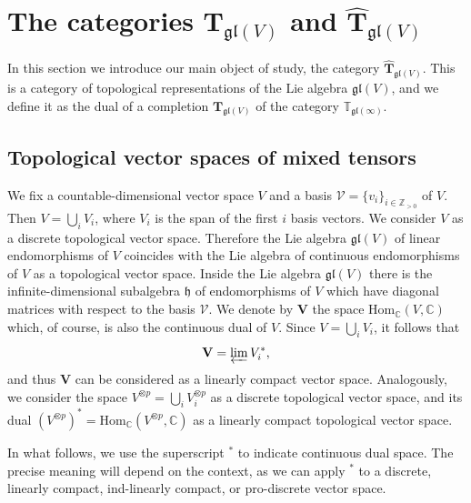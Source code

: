 \documentclass[12pt,reqno]{amsart}
\newcommand{\CC}{\mathbb{C}}
\theoremstyle{definition}
\theoremstyle{remark}
\begin{document}
	
	
	
	
	
	\section{The categories $\mathbf{T}_{\mathfrak{gl}(V)}$ and $\widehat{\mathbf T}_{\mathfrak{gl}(V)}$}
	
	In this section we introduce our main object of study, the category $\widehat{\mathbf T}_{\mathfrak{gl}(V)}$. This is a category of topological representations of the Lie algebra $\mathfrak{gl}(V)$, and we define it as the dual of a completion $\mathbf{T}_{\mathfrak{gl}(V)}$ of the category $\mathbb{T}_{\mathfrak{gl}(\infty)}$.
	
	
	
	\subsection{Topological vector spaces of mixed tensors}
	
	We fix a countable-dimensional vector space $V$ and a basis $\mathcal{V} = \{v_i\}_{i\in\mathbb{Z}_{>0}}$ of $V$. Then $V = \bigcup_i V_i$, where $V_i$ is the span of the first $i$ basis vectors. We consider $ V $ as a discrete topological vector space. Therefore the Lie algebra $\mathfrak{gl}(V)$ of linear endomorphisms of $V$ coincides with the Lie algebra of continuous endomorphisms of $V$ as a topological vector space. Inside the Lie algebra $\mathfrak{gl}(V)$ there is the infinite-dimensional subalgebra $\mathfrak{h}$ of endomorphisms of $V$ which have diagonal matrices with respect to the basis $\mathcal{V}$. We denote by $\mathbf{V}$ the space $ \mathrm{Hom}_{\CC}(V, \CC) $ which, of course, is also the continuous dual of $V$. Since $V = \bigcup_i V_i$, it follows that 
	$$
	\mathbf{V} = \varprojlim V_i ^\ast,
	$$
	and thus $ \mathbf{V} $ can be considered as a linearly compact vector space.
	Analogously, we consider the space $V^{\otimes p} = \bigcup_i V_i ^{\otimes p}$ as a discrete topological vector space, and its dual $(V^{\otimes p})^{\ast} = \mathrm{Hom}_{\mathbb{C}}(V^{\otimes p}, \mathbb{C})$ as a linearly compact topological vector space.
	
	In what follows, we use the superscript $^\ast$ to indicate continuous dual space. The precise meaning will depend on the context, as we can apply $^\ast$ to a discrete, linearly compact, ind-linearly compact, or pro-discrete vector space. 
	
	
	
\end{document}
